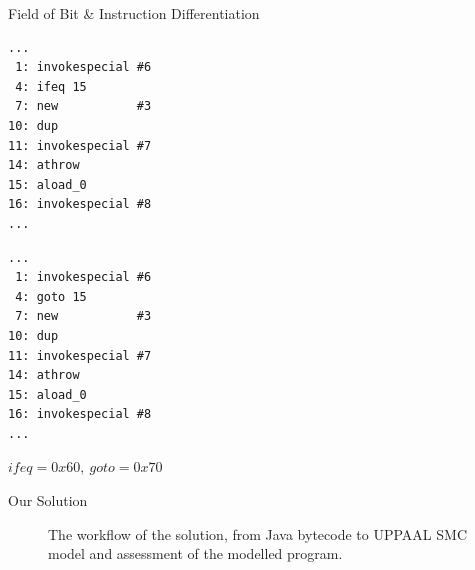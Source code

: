 \begin{frame}[fragile]{Field of Bit \& Instruction Differentiation}
\begin{minipage}{.45\textwidth}
\begin{lstlisting}[frame=single]
...
 1: invokespecial #6
 4: ifeq 15
 7: new           #3
10: dup
11: invokespecial #7
14: athrow
15: aload_0
16: invokespecial #8
...
\end{lstlisting}
\end{minipage}%
\hspace{20px}
\begin{minipage}{0.45\textwidth}
\begin{lstlisting}[frame=single]
...
 1: invokespecial #6
 4: goto 15
 7: new           #3
10: dup
11: invokespecial #7
14: athrow
15: aload_0
16: invokespecial #8
...
\end{lstlisting}
\end{minipage}
\begin{center}
$ifeq = 0x60,\:goto = 0x70$
\end{center}
\end{frame}

\begin{frame}[fragile]{Our Solution}
\begin{center}
\begin{figure}
\def\svgwidth{\columnwidth}

\caption{The workflow of the solution, from Java bytecode to UPPAAL SMC model and assessment of the modelled program.}
\label{fig:workflow_new}
\end{figure}
\end{center}
\end{frame}


